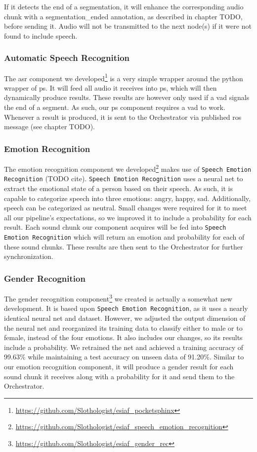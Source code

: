 If it detects the end of a segmentation, it will enhance the corresponding audio chunk with a segmentation\_ended annotation, as described in chapter TODO, before sending it.
Audio will not be transmitted to the next node(s) if it were not found to include speech.

\subsubsection{Automatic Speech Recognition}
\label{main:components:ps}
The \gls{asr} component we developed\footnote{\url{https://github.com/Slothologist/esiaf_pocketsphinx}} is a very simple wrapper around the python wrapper of \gls{ps}.
It will feed all audio it receives into \gls{ps}, which will then dynamically produce results.
These results are however only used if a \gls{vad} signals the end of a segment.
As such, our \gls{ps} component requires a \gls{vad} to work.
Whenever a result is produced, it is sent to the Orchestrator via published \gls{ros} message (see chapter TODO).

\subsubsection{Emotion Recognition}
\label{main:components:emotion}
The emotion recognition component we developed\footnote{\url{https://github.com/Slothologist/esiaf_speech_emotion_recognition}} makes use of \texttt{Speech Emotion Recognition} (TODO cite).
\texttt{Speech Emotion Recognition} uses a neural net to extract the emotional state of a person based on their speech.
As such, it is capable to categorize speech into three emotions: angry, happy, sad.
Additionally, speech can be categorized as neutral.
Small changes were required for it to meet all our pipeline's expectations, so we improved it to include a probability for each result. %
Each sound chunk our component acquires will be fed into \texttt{Speech Emotion Recognition} which will return an emotion and probability for each of these sound chunks.
These results are then sent to the Orchestrator for further synchronization.

\subsubsection{Gender Recognition}
\label{main:components:gender}
The gender recognition component\footnote{\url{https://github.com/Slothologist/esiaf_gender_rec}} we created is actually a somewhat new development.
It is based upon \texttt{Speech Emotion Recognition}, as it uses a nearly identical neural net and dataset.
However, we adjusted the output dimension of the neural net and reorganized its training data to classify either to male or to female, instead of the four emotions.
It also includes our changes, so its results include a probability.
We retrained the net and achieved a training accuracy of 99.63\% while maintaining a test accuracy on unseen data of 91.20\%.
Similar to our emotion recognition component, it will produce a gender result for each sound chunk it receives along with a probability for it and send them to the Orchestrator.

